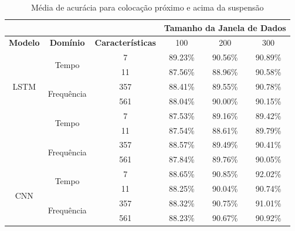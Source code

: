 \begin{table}[h!]
\scriptsize
\centering
\caption{Média de acurácia para colocação próximo e acima da suspensão}
\label{table:above_suspension_results_tipo_superficie_2}
\begin{tabular}{cccccc}
\cmidrule(l){4-6}
 & \multicolumn{1}{l}{\textbf{}} & \multicolumn{1}{l}{} & \multicolumn{3}{c}{\textbf{Tamanho da Janela de Dados}} \\ \midrule
\textbf{Modelo} & \textbf{Domínio} & \textbf{Características} & \multicolumn{1}{c}{100} & \multicolumn{1}{c}{200} & \multicolumn{1}{c}{300} \\ \midrule
\multirow{5}{*}{LSTM} & \multirow{2}{*}{Tempo} & 7 & 89.23\% & 90.56\% & \cellcolor[HTML]{34FF34}90.89\% \\ \cmidrule(l){3-6} 
 &  & 11 & 87.56\% & 88.96\% & 90.58\% \\ \cmidrule(l){2-6} 
 & \multirow{2}{*}{Frequência} & 357 & 88.41\% & 89.55\% & 90.78\% \\ \cmidrule(l){3-6} 
 &  & 561 & 88.04\% & 90.00\% & 90.15\% \\ \midrule
\multirow{5}{*}{GRU} & \multirow{2}{*}{Tempo} & 7 & 87.53\% & 89.16\% & 89.42\% \\ \cmidrule(l){3-6} 
 &  & 11 & 87.54\% & 88.61\% & 89.79\% \\ \cmidrule(l){2-6} 
 & \multirow{2}{*}{Frequência} & 357 & 88.57\% & 89.49\% & \cellcolor[HTML]{34FF34}90.41\% \\ \cmidrule(l){3-6} 
 &  & 561 & 87.84\% & 89.76\% & 90.05\% \\ \midrule
\multirow{5}{*}{CNN} & \multirow{2}{*}{Tempo} & 7 & 88.65\% & 90.85\% & \cellcolor[HTML]{34FF34}92.02\% \\ \cmidrule(l){3-6} 
 &  & 11 & 88.25\% & 90.04\% & 90.74\% \\ \cmidrule(l){2-6} 
 & \multirow{2}{*}{Frequência} & 357 & 88.32\% & 90.75\% & 91.01\% \\ \cmidrule(l){3-6} 
 &  & 561 & 88.23\% & 90.67\% & 90.92\% \\ \bottomrule
\end{tabular}
\end{table}

